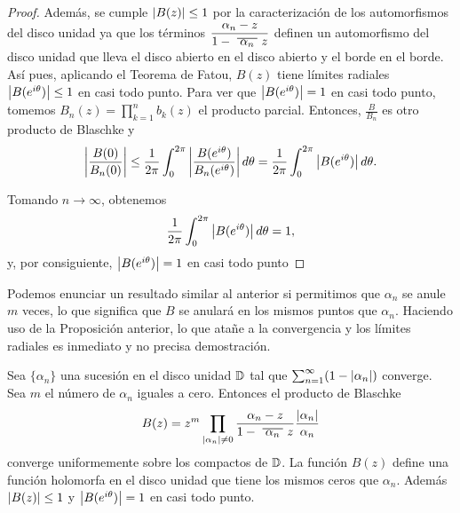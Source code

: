 \begin{proof}
    Además, se cumple $\left\lvert B(z)\right\rvert \leq 1$ por la caracterización de los automorfismos del disco unidad ya que los términos $\dfrac{\alpha_n - z}{1 - \xbar{\alpha_n}z}$ definen un automorfismo del disco unidad que lleva el disco abierto en el disco abierto y el borde en el borde. \\

    Así pues, aplicando el Teorema de Fatou, $B(z)$ tiene límites radiales $\left\lvert B(e^{i\theta})\right\rvert \leq 1$ en casi todo punto. Para ver que $\left\lvert B(e^{i \theta})\right\rvert = 1$ en casi todo punto, tomemos $B_n(z) = \prod_{k=1}^{n} b_k(z)$ el producto parcial. Entonces, $\frac{B}{B_n}$ es otro producto de Blaschke y
    \begin{equation*}
        \left\lvert\frac{B(0)}{B_n(0)}\right\rvert \leq \frac{1}{2 \pi} \int_{0}^{2 \pi} \left\lvert\frac{B(e^{i \theta})}{B_n(e^{i \theta})}\right\rvert d \theta = \frac{1}{2 \pi}  \int_{0}^{2 \pi} \left\lvert B(e^{i \theta})\right\rvert d \theta.
    \end{equation*}

    Tomando $n \to \infty$, obtenemos
    \begin{equation*}
         \frac{1}{2 \pi}  \int_{0}^{2 \pi} \left\lvert B(e^{i \theta})\right\rvert d \theta = 1,
    \end{equation*}
    y, por consiguiente, $\left\lvert B(e^{i \theta})\right\rvert = 1$ en casi todo punto
\end{proof}

Podemos enunciar un resultado similar al anterior si permitimos que $\alpha_n$ se anule $m$ veces, lo que significa que $B$ se anulará en los mismos puntos que $\alpha_n$. Haciendo uso de la Proposición anterior, lo que atañe a la convergencia y los límites radiales es inmediato y no precisa demostración. \\

\begin{corollary}
    Sea $\{\alpha_n\}$ una sucesión en el disco unidad $\mathbb{D}$ tal que $\sum_{n=1}^{\infty} (1 - \left\lvert\alpha_n\right\rvert)$ converge. Sea $m$ el número de $\alpha_n$ iguales a cero. Entonces el producto de Blaschke
\begin{equation*}
    B(z) = z^m \prod_{\abs{\alpha_n} \not = 0} \frac{\alpha_n - z}{1 - \xbar{\alpha_n}z} \dfrac{\abs{\alpha_n}}{\alpha_n}
\end{equation*}
converge uniformemente sobre los compactos de $\mathbb{D}$. La función $B(z)$ define una función holomorfa en el disco unidad que tiene los mismos ceros que $\alpha_n$. Además $\left\lvert B(z)\right\rvert \leq 1$ y $\left\lvert B(e^{i \theta})\right\rvert = 1$ en casi todo punto.
\end{corollary}
